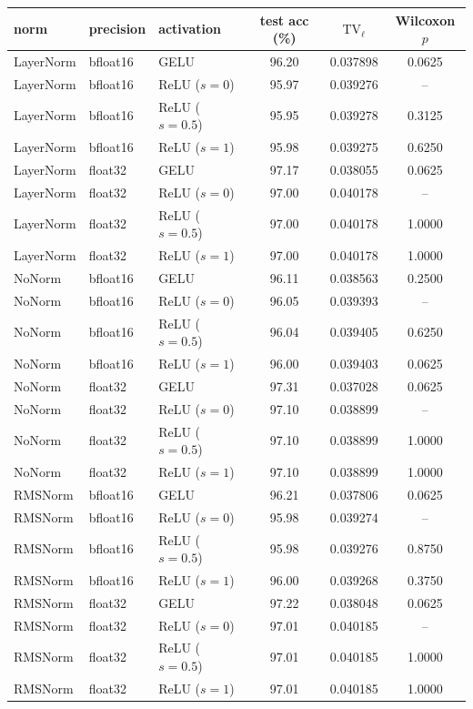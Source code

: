 \begin{tabular}{l l l c c c}
\toprule
norm & precision & activation & test acc (\%) & $\mathrm{TV}_\ell$ & Wilcoxon $p$ \\
\midrule
LayerNorm & bfloat16 & GELU & 96.20 & 0.037898 & 0.0625 \\
LayerNorm & bfloat16 & ReLU ($s=0$) & 95.97 & 0.039276 & -- \\
LayerNorm & bfloat16 & ReLU ($s=0.5$) & 95.95 & 0.039278 & 0.3125 \\
LayerNorm & bfloat16 & ReLU ($s=1$) & 95.98 & 0.039275 & 0.6250 \\
LayerNorm & float32 & GELU & 97.17 & 0.038055 & 0.0625 \\
LayerNorm & float32 & ReLU ($s=0$) & 97.00 & 0.040178 & -- \\
LayerNorm & float32 & ReLU ($s=0.5$) & 97.00 & 0.040178 & 1.0000 \\
LayerNorm & float32 & ReLU ($s=1$) & 97.00 & 0.040178 & 1.0000 \\
NoNorm & bfloat16 & GELU & 96.11 & 0.038563 & 0.2500 \\
NoNorm & bfloat16 & ReLU ($s=0$) & 96.05 & 0.039393 & -- \\
NoNorm & bfloat16 & ReLU ($s=0.5$) & 96.04 & 0.039405 & 0.6250 \\
NoNorm & bfloat16 & ReLU ($s=1$) & 96.00 & 0.039403 & 0.0625 \\
NoNorm & float32 & GELU & 97.31 & 0.037028 & 0.0625 \\
NoNorm & float32 & ReLU ($s=0$) & 97.10 & 0.038899 & -- \\
NoNorm & float32 & ReLU ($s=0.5$) & 97.10 & 0.038899 & 1.0000 \\
NoNorm & float32 & ReLU ($s=1$) & 97.10 & 0.038899 & 1.0000 \\
RMSNorm & bfloat16 & GELU & 96.21 & 0.037806 & 0.0625 \\
RMSNorm & bfloat16 & ReLU ($s=0$) & 95.98 & 0.039274 & -- \\
RMSNorm & bfloat16 & ReLU ($s=0.5$) & 95.98 & 0.039276 & 0.8750 \\
RMSNorm & bfloat16 & ReLU ($s=1$) & 96.00 & 0.039268 & 0.3750 \\
RMSNorm & float32 & GELU & 97.22 & 0.038048 & 0.0625 \\
RMSNorm & float32 & ReLU ($s=0$) & 97.01 & 0.040185 & -- \\
RMSNorm & float32 & ReLU ($s=0.5$) & 97.01 & 0.040185 & 1.0000 \\
RMSNorm & float32 & ReLU ($s=1$) & 97.01 & 0.040185 & 1.0000 \\
\bottomrule
\end{tabular}